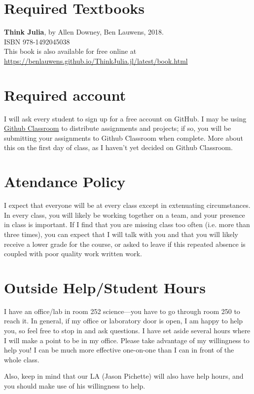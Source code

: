 \documentclass[justified]{tufte-handout}
\begin{document}
\section{Required Textbooks}

\textbf{Think Julia}, by Allen Downey, Ben Lauwens, 2018.\\
ISBN 978-1492045038\\
This book is also available for free online at\\
 \href{https://benlauwens.github.io/ThinkJulia.jl/latest/book.html}{https://benlauwens.github.io/ThinkJulia.jl/latest/book.html}
 
\section{Required account}
I will ask every student to sign up for a free account on GitHub. I may be using 
\href{http://classroom.github.com}{Github Classroom} to distribute assignments and projects; if so, you will be submitting your assignments to Github Classroom when complete. More about this on the first day of class, as I haven't yet decided on Github Classroom. 

\section{Atendance Policy}
I expect that everyone will be at every class except in extenuating circumstances. 
In every class, you will likely be working together on a team, and your presence in class
is important. If I find that you are missing class too often (i.e. more than three times), 
you can expect that I will talk with you and that you will likely receive a 
lower grade for the course, or asked to leave if this repeated absence is coupled 
with poor quality work written work. 

\section{Outside Help/Student Hours}
I have an office/lab in room 252 science---you have to go through room 250 to reach it. 
In general, if my office or laboratory door is open, I am happy to help you, so feel free to stop in
and ask questions. I have set aside several hours
where I will make a point to be in my office. Please take advantage of my
willingness to help you! I can be much more effective one-on-one than I can in
front of the whole class. 

Also, keep in mind that our LA (Jason Pichette)  will also have help hours, and you should make use of his willingness to help. 
\end{document}
